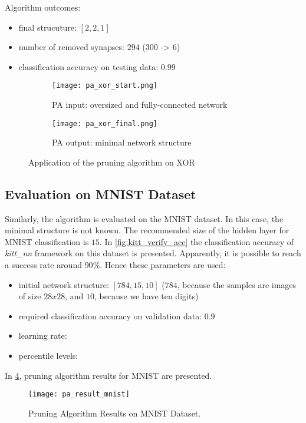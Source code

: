 Algorithm outcomes:
\begin{itemize}
\item final strucuture: $ [2, 2, 1] $
\item number of removed synapses: $ 294 $ ($ 300 $ -> $ 6 $)
\item classification accuracy on testing data: $ 0.99 $
\end{itemize}

\begin{figure}[H]
\centering
\begin{subfigure}{0.45\textwidth}
  \centering
  \texttt{[image: pa\_xor\_start.png]}
  \caption{PA input: oversized and fully-connected network}
  \label{img:pa_xor_start}
\end{subfigure}%
\begin{subfigure}{0.45\textwidth}
  \centering
  \texttt{[image: pa\_xor\_final.png]}
  \caption{PA output: minimal network structure}
  \label{img:pa_xor_final}
\end{subfigure}
\caption{Application of the pruning algorithm on XOR}
\label{img:pa_xor_morph}
\end{figure}

\subsection{Evaluation on MNIST Dataset} \label{ssec:evaluation_on_mnist}
Similarly, the algorithm is evaluated on the MNIST dataset. In this case, the minimal structure is not known. The recommended size of the hidden layer for MNIST classification is $ 15 $. In \cref{fig:kitt_verify_acc} the classification accuracy of \textit{kitt\_nn} framework on this dataset is presented. Apparently, it is possible to reach a success rate around $ 90\% $. Hence these parameters are used:

\begin{itemize}
\item initial network structure: $ [784, 15, 10] $ ($ 784 $, because the samples are images of size $ 28x28 $, and $ 10 $, because we have ten digits)
\item required classification accuracy on validation data: $ 0.9 $
\item learning rate:
\item percentile levels:
\end{itemize}

In \cref{fig:pa_result_mnist}, pruning algorithm results for MNIST are presented.
\begin{figure}[H]
  \centering
  \texttt{[image: pa\_result\_mnist]}
  \caption{Pruning Algorithm Results on MNIST Dataset.}
  \label{fig:pa_result_mnist}
\end{figure}

